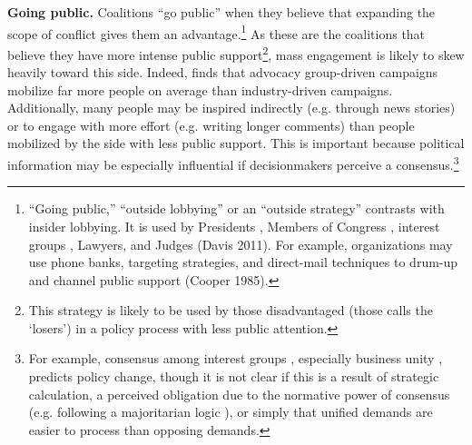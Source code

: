 \textbf{Going public.} Coalitions ``go public'' when they believe that expanding the scope of conflict gives them an advantage.\footnote{
``Going public,'' ``outside lobbying'' or an ``outside strategy'' contrasts with insider lobbying. It is used by Presidents \citep{Kernell2007}, Members of Congress \citep{Malecha2012}, interest groups \citep{Walker1991, Dur2013}, Lawyers, and Judges (Davis 2011). 
For example, organizations may use phone banks, targeting strategies, and direct-mail techniques to drum-up and channel public support (Cooper 1985).
}
As these are the coalitions that believe they have more intense public support\footnote{
This strategy is likely to be used by those disadvantaged (those \citet{Schattschneider1975} calls the `losers') in a policy process with less public attention.
}, mass engagement is likely to skew heavily toward this side. Indeed, \citet{Potter2017} finds that advocacy group-driven campaigns mobilize far more people on average than industry-driven campaigns. Additionally, many people may be inspired indirectly (e.g. through news stories) or to engage with more effort (e.g. writing longer comments) than people mobilized by the side with less public support.  This is important because political information may be especially influential if decisionmakers perceive a consensus.\footnote{
For example, consensus among interest groups \citep{Golden1998, Yackee2006JPART}, especially business unity \citep{Yackee2006JOP, Haeder2015}, predicts policy change, though it is not clear if this is a result of strategic calculation, a perceived obligation due to the normative power of consensus (e.g. following a majoritarian logic \citep{Mendelson2011}), or simply that unified demands are easier to process than opposing demands.
}

